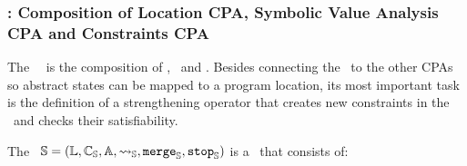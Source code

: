 \subsubsection{\SymbolicExecutionCPA : Composition of Location CPA, Symbolic Value Analysis CPA and Constraints CPA}
The \symbolicExecutionCPA\ \cite{Lemberger2015}\ is the composition of \locationCPA, \symbolicValueAnalysisCPA\ and \constraintsCPA.
Besides connecting the \locationCPA\ to the other CPAs so abstract states can be mapped to a program location, its most important task is the definition of a strengthening operator that creates new constraints in the \constraintsCPA\ and checks their satisfiability.

The \symbolicExecutionCPA\ $\mathbb{S} = (\mathbb{L}, \mathbb{C_{S}}, \mathbb{A}, \rightsquigarrow_{\mathbb{S}}, \texttt{merge}_{\mathbb{S}}, \texttt{stop}_{\mathbb{S}})$ is a \compositeCPA\ that consists of:
